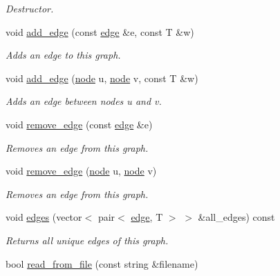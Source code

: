 \begin{DoxyCompactItemize}
\begin{DoxyCompactList}\small\item\em Destructor. \end{DoxyCompactList}\item 
void \hyperlink{classlgraph_1_1utils_1_1wugraph_a8e4db27ca594bc78cde948a7c9fa1f00}{add\+\_\+edge} (const \hyperlink{namespacelgraph_1_1utils_a6510284ce1b1ae5dc97ce5d2de426e10}{edge} \&e, const T \&w)
\begin{DoxyCompactList}\small\item\em Adds an edge to this graph. \end{DoxyCompactList}\item 
void \hyperlink{classlgraph_1_1utils_1_1wugraph_a64d5de79fb869156ba3a110a68d6ea3f}{add\+\_\+edge} (\hyperlink{namespacelgraph_1_1utils_ab9c6b34241f0b68372c55f34c460e863}{node} u, \hyperlink{namespacelgraph_1_1utils_ab9c6b34241f0b68372c55f34c460e863}{node} v, const T \&w)
\begin{DoxyCompactList}\small\item\em Adds an edge between nodes {\itshape u} and {\itshape v}. \end{DoxyCompactList}\item 
void \hyperlink{classlgraph_1_1utils_1_1wugraph_ad91246c2a9844d837ddb26e5abe563c6}{remove\+\_\+edge} (const \hyperlink{namespacelgraph_1_1utils_a6510284ce1b1ae5dc97ce5d2de426e10}{edge} \&e)
\begin{DoxyCompactList}\small\item\em Removes an edge from this graph. \end{DoxyCompactList}\item 
void \hyperlink{classlgraph_1_1utils_1_1wugraph_a8fd7f1a7ef76576a35e72687f4fdfce1}{remove\+\_\+edge} (\hyperlink{namespacelgraph_1_1utils_ab9c6b34241f0b68372c55f34c460e863}{node} u, \hyperlink{namespacelgraph_1_1utils_ab9c6b34241f0b68372c55f34c460e863}{node} v)
\begin{DoxyCompactList}\small\item\em Removes an edge from this graph. \end{DoxyCompactList}\item 
void \hyperlink{classlgraph_1_1utils_1_1wugraph_a877370aeb266c3fbe14f6ef890bff504}{edges} (vector$<$ pair$<$ \hyperlink{namespacelgraph_1_1utils_a6510284ce1b1ae5dc97ce5d2de426e10}{edge}, T $>$ $>$ \&all\+\_\+edges) const 
\begin{DoxyCompactList}\small\item\em Returns all unique edges of this graph. \end{DoxyCompactList}\item 
bool \hyperlink{classlgraph_1_1utils_1_1wugraph_a8c691c210f9b8f558f323f2aa187e5eb}{read\+\_\+from\+\_\+file} (const string \&filename)\hypertarget{classlgraph_1_1utils_1_1wugraph_a8c691c210f9b8f558f323f2aa187e5eb}{}\label{classlgraph_1_1utils_1_1wugraph_a8c691c210f9b8f558f323f2aa187e5eb}


\end{DoxyCompactItemize}
